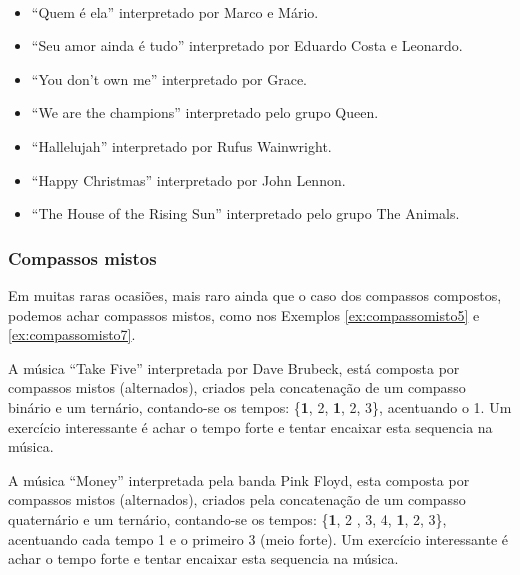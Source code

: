 \begin{example}
\label{ex:compassocomposto6b}
~
\begin{itemize}
\item ``Quem é ela'' interpretado por Marco e Mário.
\item ``Seu amor ainda é tudo'' interpretado por Eduardo Costa e Leonardo.
\item ``You don't own me'' interpretado por Grace.
\item ``We are the champions'' interpretado pelo grupo Queen.
\item ``Hallelujah'' interpretado por Rufus Wainwright.
\item ``Happy Christmas'' interpretado por John Lennon.
\item ``The House of the Rising Sun'' interpretado pelo grupo  The Animals.
\end{itemize}
\end{example}

\subsubsection{Compassos mistos}
Em muitas raras ocasiões, mais raro ainda que o caso dos compassos compostos, 
podemos achar compassos mistos, como nos Exemplos \ref{ex:compassomisto5} e \ref{ex:compassomisto7}.

\begin{example}
\label{ex:compassomisto5}
A música ``Take Five'' interpretada por  Dave Brubeck,
está composta por compassos mistos (alternados), criados pela concatenação de um compasso binário e um ternário,
contando-se os tempos: \{\textbf{1}, 2, \textbf{1}, 2, 3\}, acentuando o 1.
Um exercício interessante é achar o tempo forte  e tentar encaixar esta sequencia na música.
\end{example}

\begin{example}
\label{ex:compassomisto7}
A música ``Money'' interpretada pela banda  Pink Floyd,
esta composta por compassos mistos (alternados), criados pela concatenação de um compasso quaternário e um ternário,
contando-se os tempos: \{\textbf{1}, 2 , 3, 4, \textbf{1}, 2, 3\}, acentuando cada tempo 1 e o primeiro 3 (meio forte).
Um exercício interessante é achar o tempo forte  e tentar encaixar esta sequencia na música.
\end{example}
